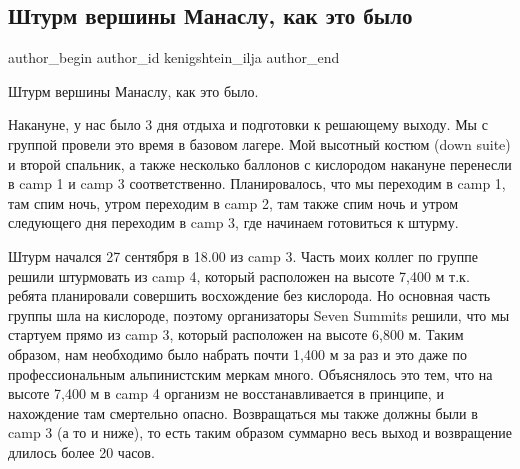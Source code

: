  
 
 
 
 
 
\subsection{Штурм вершины Манаслу, как это было}
\label{sec:05_10_2021.fb.kenigshtein_ilja.1.shturm_manaslu}
 
\ifcmt
 author_begin
   author_id kenigshtein_ilja
 author_end
\fi

Штурм вершины Манаслу, как это было. 

Накануне, у нас было 3 дня отдыха и подготовки к решающему выходу. Мы с группой
провели это время в базовом лагере. Мой высотный костюм (down suite) и второй
спальник, а также несколько баллонов с кислородом  накануне перенесли в camp 1
и camp 3 соответственно. Планировалось, что мы переходим в camp 1, там спим
ночь, утром переходим в camp 2, там также спим ночь и утром следующего дня
переходим в camp 3, где начинаем готовиться к штурму. 

Штурм начался 27 сентября в 18.00 из camp 3. Часть моих коллег по группе решили
штурмовать из camp 4, который расположен на высоте 7,400 м т.к. ребята
планировали совершить восхождение без кислорода. Но основная часть группы шла
на кислороде, поэтому организаторы Seven Summits решили, что мы стартуем прямо
из camp 3, который расположен на высоте 6,800 м. Таким образом, нам необходимо
было набрать почти 1,400 м за раз и это даже по профессиональным альпинистским
меркам много. Объяснялось это тем, что на высоте 7,400 м в camp 4 организм не
восстанавливается в принципе, и нахождение там смертельно опасно. Возвращаться
мы также должны были в camp 3 (а то и ниже), то есть таким образом суммарно
весь выход и возвращение длилось более 20 часов. 

